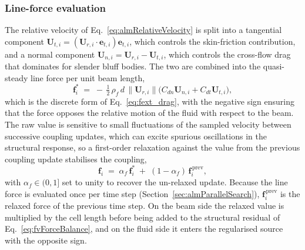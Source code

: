 \subsubsection{Line-force evaluation}
\label{sec:almLineForce}
The relative velocity of Eq.~\eqref{eq:almRelativeVelocity} is split into a tangential component $\mathbf{U}_{t,i} = (\mathbf{U}_{r,i}\!\cdot\!\mathbf{e}_{t,i})\mathbf{e}_{t,i}$, which controls the skin-friction contribution, and a normal component $\mathbf{U}_{n,i} = \mathbf{U}_{r,i} - \mathbf{U}_{t,i}$, which controls the cross-flow drag that dominates for slender bluff bodies. The two are combined into the quasi-steady line force per unit beam length,
\begin{equation}
\mathbf{f}^{*}_{i}
\;=\;
-\,\tfrac{1}{2}\,\rho_{f}\,d\,
\bigl\lVert\mathbf{U}_{r,i}\bigr\rVert
\bigl(C_{dn}\mathbf{U}_{n,i} + C_{dt}\mathbf{U}_{t,i}\bigr),
\label{eq:almLineForce}
\end{equation}
which is the discrete form of Eq.~\eqref{eq:fext_drag}, with the negative sign ensuring that the force opposes the relative motion of the fluid with respect to the beam. The raw value is sensitive to small fluctuations of the sampled velocity between successive coupling updates, which can excite spurious oscillations in the structural response, so a first-order relaxation against the value from the previous coupling update stabilises the coupling,
\begin{equation}
\mathbf{f}_{i}
\;=\;
\alpha_{f}\,\mathbf{f}^{*}_{i}
\;+\;
(1 - \alpha_{f})\,\mathbf{f}^{\,\mathrm{prev}}_{i},
\label{eq:almForceRelaxation}
\end{equation}
with $\alpha_{f}\in(0,1]$ set to unity to recover the un-relaxed update. Because the line force is evaluated once per time step (Section~\ref{sec:almParallelSearch}), $\mathbf{f}^{\,\mathrm{prev}}_{i}$ is the relaxed force of the previous time step. On the beam side the relaxed value is multiplied by the cell length before being added to the structural residual of Eq.~\eqref{eq:fvForceBalance}, and on the fluid side it enters the regularised source with the opposite sign.

